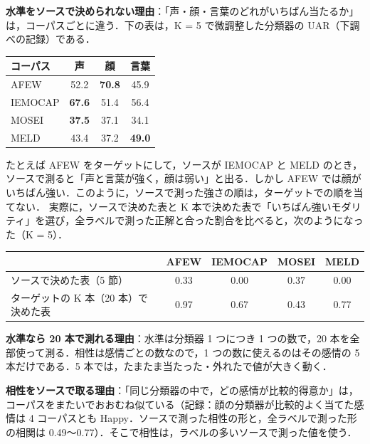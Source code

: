 \documentclass[a4paper,11pt]{ltjsarticle}
\begin{document}
\noindent\textbf{水準をソースで決められない理由}：「声・顔・言葉のどれがいちばん当たるか」は，コーパスごとに違う．下の表は，K = 5 で微調整した分類器の UAR（下調べの記録）である．
\begin{center}
\small
\begin{tabular}{lccc}
\toprule
コーパス & 声 & 顔 & 言葉 \\
\midrule
AFEW & 52.2 & \textbf{70.8} & 45.9 \\
IEMOCAP & \textbf{67.6} & 51.4 & 56.4 \\
MOSEI & \textbf{37.5} & 37.1 & 34.1 \\
MELD & 43.4 & 37.2 & \textbf{49.0} \\
\bottomrule
\end{tabular}
\end{center}
たとえば AFEW をターゲットにして，ソースが IEMOCAP と MELD のとき，ソースで測ると「声と言葉が強く，顔は弱い」と出る．しかし AFEW では顔がいちばん強い．このように，ソースで測った強さの順は，ターゲットでの順を当てない．
実際に，ソースで決めた表と K 本で決めた表で「いちばん強いモダリティ」を選び，全ラベルで測った正解と合った割合を比べると，次のようになった（K = 5）．
\begin{center}
\small
\begin{tabular}{lcccc}
\toprule
 & AFEW & IEMOCAP & MOSEI & MELD \\
\midrule
ソースで決めた表（5 節） & 0.33 & 0.00 & 0.37 & 0.00 \\
ターゲットの K 本（20 本）で決めた表 & 0.97 & 0.67 & 0.43 & 0.77 \\
\bottomrule
\end{tabular}
\end{center}

\noindent\textbf{水準なら 20 本で測れる理由}：水準は分類器 1 つにつき 1 つの数で，20 本を全部使って測る．相性は感情ごとの数なので，1 つの数に使えるのはその感情の 5 本だけである．5 本では，たまたま当たった・外れたで値が大きく動く．

\noindent\textbf{相性をソースで取る理由}：「同じ分類器の中で，どの感情が比較的得意か」は，コーパスをまたいでおおむね似ている（記録：顔の分類器が比較的よく当てた感情は 4 コーパスとも Happy．ソースで測った相性の形と，全ラベルで測った形の相関は 0.49〜0.77）．そこで相性は，ラベルの多いソースで測った値を使う．
\end{document}
